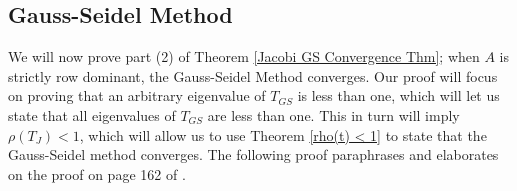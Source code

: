 \documentclass[12pt,letterpaper]{article}
\theoremstyle{definition}
\begin{document}



\subsection{Gauss-Seidel Method}
We will now prove part (2) of Theorem \ref{Jacobi GS Convergence Thm}; when $A$ is strictly row dominant, the Gauss-Seidel Method converges. Our proof will focus on proving that an arbitrary eigenvalue of $T_{GS}$ is less than one, which will let us state that all eigenvalues of $T_{GS}$ are less than one. This in turn will imply $\rho(T_J) < 1$, which will allow us to use Theorem \ref{rho(t) < 1} to state that the Gauss-Seidel method converges. The following proof paraphrases and elaborates on the proof on page 162 of \cite{GSProof}.
\end{document}
